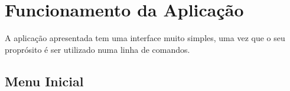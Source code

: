 \chapter{Funcionamento da Aplicação }

A aplicação apresentada tem uma interface muito simples, uma vez que o seu
proprósito é ser utilizado numa linha de comandos.

\section{Menu Inicial}

